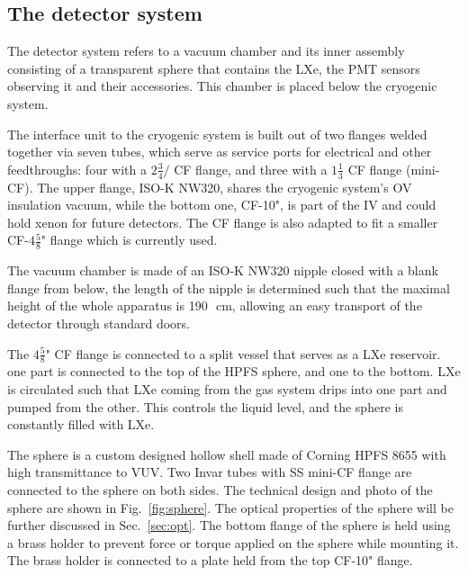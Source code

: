 \subsection{The detector system}
\label{subsec:det}
 
The detector system refers to a vacuum chamber and its inner assembly consisting of a transparent sphere that 
contains the LXe, the PMT sensors observing it and their accessories. This chamber is placed below the cryogenic system. 


The interface unit to the cryogenic system is built out of two flanges welded together via seven tubes, which serve as service ports for electrical and other feedthroughs: four 
with a $2 \frac{3}{4}/$ CF flange, and three with a $1\frac{1}{3}$ CF flange (mini-CF). 
The upper flange, ISO-K NW320, shares the cryogenic system's OV insulation vacuum, while the bottom one, CF-10", is part of the IV and could hold xenon for future detectors. 
The CF flange is also adapted to fit a smaller CF-$4\frac{5}{8}$" flange which is currently used.

The vacuum chamber is made of an ISO-K NW320 nipple closed with a blank flange from below, 
the length of the nipple is determined such that the maximal height of the whole 
apparatus is 190~\,cm, allowing an easy transport of the detector through standard doors.
 
The $4\frac{5}{8}$" CF flange is connected to a split vessel that serves as a LXe reservoir. one part is connected 
to the top of the HPFS sphere, and one to the bottom. LXe is circulated such that LXe coming from the gas system drips into one part and pumped from the other. This controls the liquid level, and the sphere is constantly filled with LXe. 


The sphere is a custom designed hollow shell made of Corning HPFS 8655 with high transmittance to VUV. Two Invar tubes with SS mini-CF flange are connected to the sphere on both sides. The technical design and photo of the sphere are shown in Fig.~\ref{fig:sphere}. The optical properties of the sphere will be further discussed in Sec.~\ref{sec:opt}. 
The bottom flange of the sphere is held using a brass holder to prevent 
force or torque applied on the sphere while mounting it. The 
brass holder is connected to a plate held from the top CF-10" flange. 



